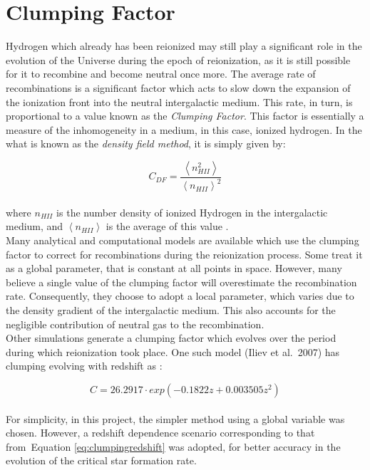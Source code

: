 \documentclass [a4paper, 12pt] {article}
\begin{document}
\section{Clumping Factor}

Hydrogen which already has been reionized may still play a significant role in the evolution of the Universe during the epoch of reionization, as it is still possible for it to recombine and become neutral once more. The average rate of recombinations is a significant factor which acts to slow down the expansion of the ionization front into the neutral intergalactic medium. This rate, in turn, is proportional to a value known as the \emph{Clumping Factor}. This factor is essentially a measure of the inhomogeneity in a medium, in this case, ionized hydrogen. In the what is known as the \emph{density field method}, it is simply given by:

\begin{equation} \label{eq:clumpingnHII}
C_{DF}=\frac{\left \langle n_{HII}^2 \right \rangle}{\left \langle n_{HII} \right \rangle^2}
\end{equation}
\\
\newline
where $n_{HII}$ is the number density of ionized Hydrogen in the intergalactic medium, and $\left \langle n_{HII} \right \rangle$ is the average of this value \cite{2012ApJ...747..100S}.
\\
\newline
Many analytical and computational models are available which use the clumping factor to correct for recombinations during the reionization process. Some treat it as a global parameter, that is constant at all points in space. However, many believe a single value of the clumping factor will overestimate the recombination rate. Consequently, they choose to adopt a local parameter, which varies due to the density gradient of the intergalactic medium. This also accounts for the negligible contribution of neutral gas to the recombination\cite{MNL2:MNL2993}.
\\
\newline
Other simulations generate a clumping factor which evolves over the period during which reionization took place. One such model (Iliev et al.~2007) has clumping evolving with redshift as \cite{Pawlik21042009}:

\begin{equation} \label{eq:clumpingredshift}
C=26.2917 \cdot exp\left ( -0.1822z+0.003505z^2 \right )
\end{equation}
\\
\newline
For simplicity, in this project, the simpler method using a global variable was chosen. However, a redshift dependence scenario corresponding to that from~Equation \ref {eq:clumpingredshift} was adopted, for better accuracy in the evolution of the critical star formation rate.
\end{document}

